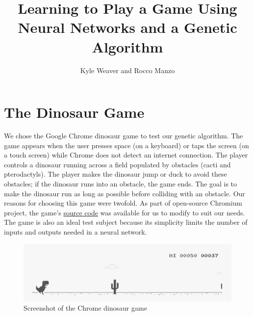\documentclass[11pt, oneside]{article}   	%
\title{Learning to Play a Game Using Neural Networks and a Genetic Algorithm}
\author{Kyle Weaver and Rocco Manzo}
\begin{document}
\maketitle

\begin{abstract}
\end{abstract}

\section{The Dinosaur Game}
We chose the Google Chrome dinosaur game to test our genetic algorithm. The game appears when the user presses space (on a keyboard) or taps the screen (on a touch screen) while Chrome does not detect an internet connection. The player controls a dinosaur running across a field populated by obstacles (cacti and pterodactyls). The player makes the dinosaur jump or duck to avoid these obstacles; if the dinosaur runs into an obstacle, the game ends. The goal is to make the dinosaur run as long as possible before colliding with an obstacle. Our reasons for choosing this game were twofold. As part of open-source Chromium project, the game's \href{https://github.com/chromium/chromium/tree/master/components/neterror/resources}{source code} was available for us to modify to suit our needs. The game is also an ideal test subject because its simplicity limits the number of inputs and outputs needed in a neural network.
\begin{figure}[h]
\caption{Screenshot of the Chrome dinosaur game}
\includegraphics[width=\textwidth]{dino}
\end{figure}
\end{document}
